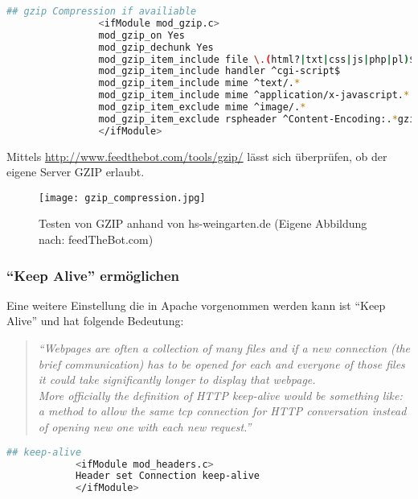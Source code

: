 			\begin{lstlisting}[captionpos=b, caption=gzip, label=lst:gzip, language=bash]
				## gzip Compression if availiable
				<ifModule mod_gzip.c>
				mod_gzip_on Yes
				mod_gzip_dechunk Yes
				mod_gzip_item_include file \.(html?|txt|css|js|php|pl)$
				mod_gzip_item_include handler ^cgi-script$
				mod_gzip_item_include mime ^text/.*
				mod_gzip_item_include mime ^application/x-javascript.*
				mod_gzip_item_exclude mime ^image/.*
				mod_gzip_item_exclude rspheader ^Content-Encoding:.*gzip.*
				</ifModule>
			\end{lstlisting}

			Mittels \url{http://www.feedthebot.com/tools/gzip/} lässt sich überprüfen, ob der eigene Server GZIP erlaubt.

			\begin{figure}[htbp]
				\begin{center}
					\texttt{[image: gzip\_compression.jpg]}
					\caption{Testen von GZIP anhand von hs-weingarten.de (Eigene Abbildung nach: feedTheBot.com)}
					\label{fig:gzip_compression}
				\end{center}
			\end{figure}
			
			\pagebreak

		\subsubsection{"`Keep Alive"' ermöglichen} %
		\label{ssub:keep_alive_ermöglichen}
			Eine weitere Einstellung die in Apache vorgenommen werden kann ist "`Keep Alive"' und hat folgende Bedeutung:
			\begin{quote}
				\textit{"`Webpages are often a collection of many files and if a new connection (the brief communication) has to be opened for each and everyone of those files it could take significantly longer to display that webpage.\\
				More officially the definition of HTTP keep-alive would be something like: a method to allow the same tcp connection for HTTP conversation instead of opening new one with each new request."'}\autocite{sextonAlive}
			\end{quote}

		\begin{lstlisting}[captionpos=b, caption=.htaccess Eintrag nach \autocite{sextonAlive}, label=lst:keepAlive, language=bash]
			## keep-alive
			<ifModule mod_headers.c> 
			Header set Connection keep-alive
			</ifModule>
		\end{lstlisting}
			
